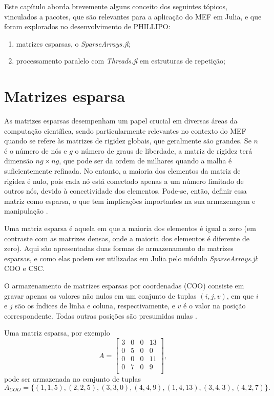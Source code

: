Este capítulo aborda brevemente alguns conceito dos seguintes tópicos, vinculados a pacotes, que são relevantes para a aplicação do MEF em Julia, e que foram explorados no desenvolvimento de PHILLIPO:

\begin{enumerate}
    \item matrizes esparsas, o \emph{SparseArrays.jl};
    \item processamento paralelo com \emph{Threads.jl} em estruturas de repetição;
\end{enumerate}


\section{Matrizes esparsa}

As matrizes esparsas desempenham um papel crucial em diversas áreas da computação científica, sendo particularmente relevantes no contexto do MEF quando se refere às matrizes de rigidez globais, que geralmente são grandes. Se $n$ é o número de nós e $g$ o número de graus de liberdade, a matriz de rigidez terá dimensão $ng \times ng$, que pode ser da ordem de milhares quando a malha é suficientemente refinada. No entanto, a maioria dos elementos da matriz de rigidez é nulo, pois cada nó está conectado apenas a um número limitado de outros nós, devido à conectividade dos elementos. Pode-se, então, definir essa matriz como esparsa, o que tem implicações importantes na sua armazenagem e manipulação \cite{LOGAN}.

Uma matriz esparsa é aquela em que a maioria dos elementos é igual a zero (em contraste com as matrizes densas, onde a maioria dos elementos é diferente de zero). Aqui são apresentadas duas formas de armazenamento de matrizes esparsas, e como elas podem ser utilizadas em Julia pelo módulo \emph{SparseArrays.jl}: COO e CSC.

O armazenamento de matrizes esparsas por coordenadas (COO) consiste em gravar apenas os valores não nulos em um conjunto de tuplas $(i, j, v)$, em que $i$ e $j$ são os índices de linha e coluna, respectivamente, e $v$ é o valor na posição correspondente. Todas outras posições são presumidas nulas \cite{sparse}. 

Uma matriz esparsa, por exemplo
\begin{equation}
    A = 
    \begin{bmatrix}
        3 & 0 & 0 & 13 \\
        0 & 5 & 0 & 0 \\
        0 & 0 & 0 & 11 \\
        0 & 7 & 0 & 9 \\
    \end{bmatrix},
    \label{eq:coo_matrix}
\end{equation}
pode ser armazenada no conjunto de tuplas
\begin{equation}
    A_{COO} = \{(1,1,5), (2,2,5), (3,3,0), (4,4,9), (1,4,13), (3,4,3), (4,2,7)\}.
    \label{eq:coo}
\end{equation}

